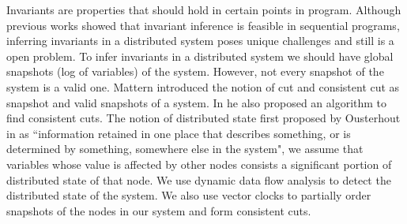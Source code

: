 Invariants are properties that should hold in  certain points in program. Although previous works \cite{ernst2001dynamically} showed that invariant inference is feasible in sequential programs, inferring invariants in a distributed system poses unique challenges and still is a open problem. To infer invariants in a distributed system we should have global snapshots (log of variables) of the system. However, not every snapshot of the system is a valid one. Mattern introduced the notion of cut and consistent cut as snapshot and valid snapshots of a system. In \cite{mattern1989virtual} he also proposed an algorithm to find consistent cuts. The notion of distributed state first proposed by Ousterhout in \cite{ousterhout1991role} as ``information retained in one place that describes something, or is determined by something, somewhere else in the system", we assume that variables whose value is affected by other nodes consists a significant portion of distributed state of that node. We use dynamic data flow analysis to detect the distributed state of the system. We also use vector clocks to partially order snapshots of the nodes in our system and form consistent cuts.

